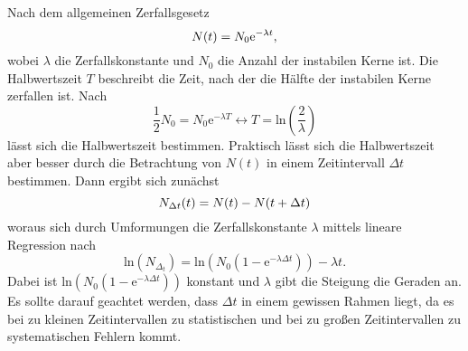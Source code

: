 Nach dem allgemeinen Zerfallsgesetz
\begin{equation}
    N(t) = N_0 \text{e}^{-\lambda t},   \notag
\end{equation}
wobei $\lambda$ die Zerfallskonstante und $N_0$ die Anzahl der instabilen Kerne ist.
Die Halbwertszeit $T$ beschreibt die Zeit, nach der die Hälfte der instabilen Kerne zerfallen ist.
Nach
\begin{equation}
    \label{eq:3}
    \frac{1}{2} N_0 = N_0 \text{e}^{-\lambda T} \leftrightarrow T = \text{ln}\left(\frac{2}{\lambda}\right)
\end{equation}
lässt sich die Halbwertszeit bestimmen.
Praktisch lässt sich die Halbwertszeit aber besser durch die Betrachtung von $N(t)$ in einem Zeitintervall $\Delta t$ bestimmen.
Dann ergibt sich zunächst
\begin{equation}
    N_{\Delta t} (t) = N(t) - N(t + \Delta t)  \notag
\end{equation}
woraus sich durch Umformungen die Zerfallskonstante $\lambda$ mittels lineare Regression nach
\begin{equation}
\label{eq:4}
    \text{ln}(N_{\Delta_t}) = \text{ln}(N_0 (1 - \text{e}^{-\lambda \Delta t})) - \lambda t.
\end{equation}
Dabei ist $\text{ln}(N_0 (1 - \text{e}^{-\lambda \Delta t}))$ konstant und $\lambda$ gibt die Steigung die Geraden an.
Es sollte darauf geachtet werden, dass $\Delta t$ in einem gewissen Rahmen liegt, da es bei zu kleinen Zeitintervallen zu statistischen und bei zu gro\ss{}en Zeitintervallen zu systematischen Fehlern kommt.
